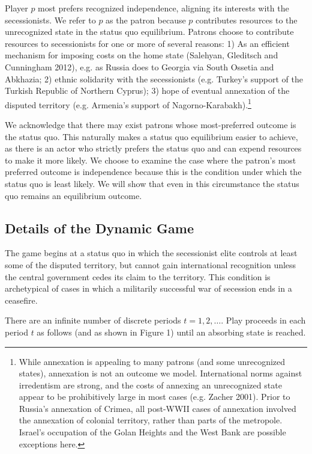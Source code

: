 \documentclass[11pt,letterpaper, notitlepage]{article}
\begin{document}
Player $p$ most prefers recognized independence, aligning its interests with the secessionists. We refer to $p$ as the patron because $p$ contributes resources to the unrecognized state in the status quo equilibrium. Patrons choose to contribute resources to secessionists for one or more of several reasons: 1) As an efficient mechanism for imposing costs on the home state (Salehyan, Gleditsch and Cunningham 2012), e.g. as Russia does to Georgia via South Ossetia and Abkhazia; 2) ethnic solidarity with the secessionists (e.g. Turkey's support of the Turkish Republic of Northern Cyprus); 3) hope of eventual annexation of the disputed territory (e.g. Armenia's support of Nagorno-Karabakh).\footnote{While annexation is appealing to many patrons (and some unrecognized states), annexation is not an outcome we model. International norms against irredentism are strong, and the costs of annexing an unrecognized state appear to be prohibitively large in most cases (e.g. Zacher 2001). Prior to Russia's annexation of Crimea, all post-WWII cases of annexation involved the annexation of colonial territory, rather than parts of the metropole. Israel's occupation of the Golan Heights and the West Bank are possible exceptions here.}

We acknowledge that there may exist patrons whose most-preferred outcome is the status quo. This naturally makes a status quo equilibrium easier to achieve, as there is an actor who strictly prefers the status quo and can expend resources to make it more likely. We choose to examine the case where the patron's most preferred outcome is independence because this is the condition under which the status quo is least likely. We will show that even in this circumstance the status quo remains an equilibrium outcome.    

\subsection{Details of the Dynamic Game}
\label{sec:structure}

The game begins at a status quo in which the secessionist elite controls at least some of the disputed territory, but cannot gain international recognition unless the central government cedes its claim to the territory. This condition is archetypical of cases in which a militarily successful war of secession ends in a ceasefire.  

There are an infinite number of discrete periods $t=1,2,\ldots$. Play proceeds in each period $t$ as follows (and as shown in Figure 1) until an absorbing state is reached.
\end{document}
